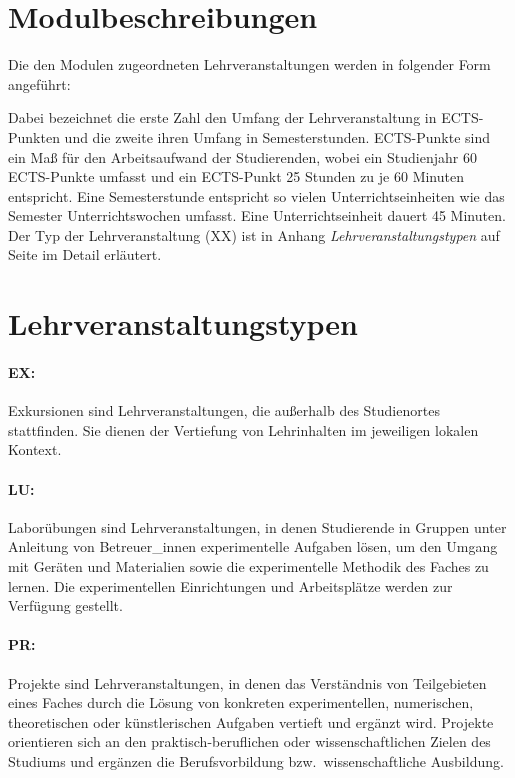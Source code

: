 \appendix
\section{Modulbeschreibungen}\label{app:AMB}

Die den Modulen zugeordneten Lehrveranstaltungen werden in folgender
Form angeführt:

\noindent
Dabei bezeichnet die erste Zahl den Umfang der
Lehrveranstaltung in ECTS-Punkten und die zweite ihren Umfang in
Semesterstunden. ECTS-Punkte sind ein Maß für den Arbeitsaufwand der
Studierenden, wobei ein Studienjahr 60 ECTS-Punkte umfasst und ein
ECTS-Punkt 25 Stunden zu je 60 Minuten entspricht. Eine Semesterstunde 
entspricht so vielen Unterrichtseinheiten wie das Semester 
Unterrichtswochen umfasst. Eine Unterrichtseinheit dauert 45 Minuten. 
Der Typ der Lehrveranstaltung (XX) ist in Anhang \emph{Lehrveranstaltungstypen} 
auf Seite \pageref{app:ALT} im Detail erläutert.

%

\section{Lehrveranstaltungstypen}\label{app:ALT}

\paragraph{EX:} Exkursionen sind Lehrveranstaltungen, die außerhalb
des Studienortes stattfinden. Sie dienen der Vertiefung von
Lehrinhalten im jeweiligen lokalen Kontext.

\paragraph{LU:} Laborübungen sind Lehrveranstaltungen, in denen
Studierende in Gruppen unter Anleitung von Betreuer\_innen 
experimentelle Aufgaben lösen, um den Umgang mit Geräten und
Materialien sowie die experimentelle Methodik des Faches zu
lernen. Die experimentellen Einrichtungen und Arbeitsplätze werden zur
Verfügung gestellt.

\paragraph{PR:} Projekte sind Lehrveranstaltungen, in denen das
Verständnis von Teilgebieten eines Faches durch die Lösung von
konkreten experimentellen, numerischen, theoretischen oder
künstlerischen Aufgaben vertieft und ergänzt wird. Projekte
orientieren sich an den praktisch-beruflichen oder wissenschaftlichen
Zielen des Studiums und ergänzen die Berufsvorbildung
bzw.\ wissenschaftliche Ausbildung.

